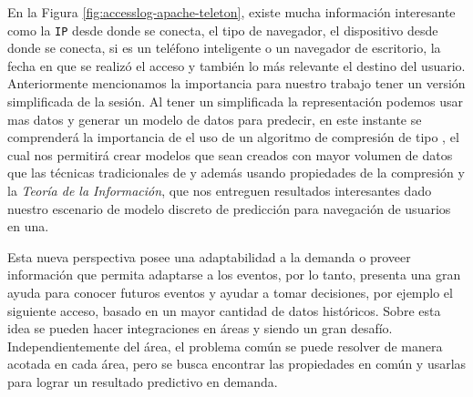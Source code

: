


En la Figura \ref{fig:accesslog-apache-teleton}, existe mucha información interesante como la \texttt{IP} desde donde se conecta, el tipo de navegador, el dispositivo desde donde se conecta, si es un teléfono inteligente o un navegador de escritorio, la fecha en que se realizó el acceso y también lo más relevante el destino del usuario. Anteriormente mencionamos la importancia para nuestro trabajo tener un versión simplificada de la sesión. Al tener un simplificada la representación podemos usar mas datos y generar un modelo de datos para predecir, en este instante se comprenderá la importancia de el uso de un algoritmo de compresión de tipo  \losslessdatacompression, el cual nos permitirá crear modelos que sean creados con mayor volumen de datos que las técnicas tradicionales de \machinelearning y además usando propiedades de la compresión y la \emph{Teoría de la Información}, que nos entreguen resultados interesantes dado nuestro escenario de modelo discreto de predicción para navegación de  usuarios en una.
   
Esta nueva perspectiva posee una adaptabilidad a la demanda o proveer información que permita adaptarse a los eventos, por lo tanto, presenta una gran ayuda para conocer futuros eventos y ayudar a tomar decisiones, por ejemplo el siguiente acceso, basado en un mayor cantidad de datos históricos. Sobre esta idea se pueden hacer integraciones en áreas  \losslessdatacompression y \machinelearning siendo un gran desafío. Independientemente del área, el problema común  se puede resolver de manera acotada en cada área, pero se busca encontrar las propiedades en común y usarlas para lograr un resultado predictivo en demanda.  








